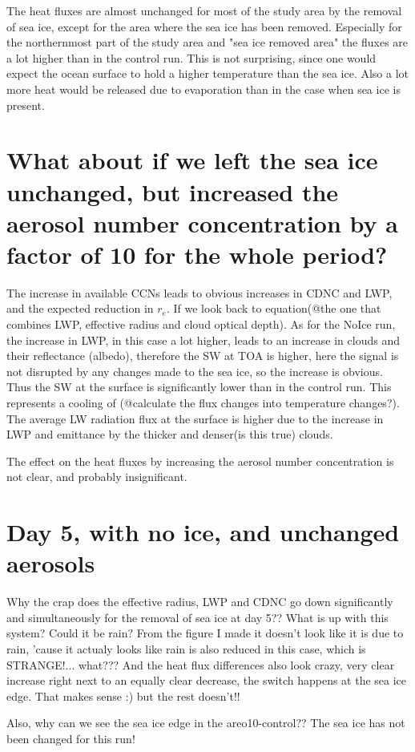 The heat fluxes are almost unchanged for most of the study area by the removal of sea ice, except for the area where the sea ice has been removed. Especially for the northernmost part of the study area and "sea ice removed area" the fluxes are a lot higher than in the control run. This is not surprising, since one would expect the ocean surface to hold a higher temperature than the sea ice. Also a lot more heat would be released due to evaporation than in the case when sea ice is present.

\section{What about if we left the sea ice unchanged, but increased the aerosol number concentration by a factor of 10 for the whole period?}
The increase in available CCNs leads to obvious increases in CDNC and LWP, and the expected reduction in $r_e$. If we look back to equation(@the one that combines LWP, effective radius and cloud optical depth). As for the NoIce run, the increase in LWP, in this case a lot higher, leads to an increase in clouds and their reflectance (albedo), therefore the SW at TOA is higher, here the signal is not disrupted by any changes made to the sea ice, so the increase is obvious. Thus the SW at the surface is significantly lower than in the control run. This represents a cooling of (@calculate the flux changes into temperature changes?). The average LW radiation flux at the surface is higher due to the increase in LWP and emittance by the thicker and denser(is this true) clouds.

The effect on the heat fluxes by increasing the aerosol number concentration is not clear, and probably insignificant.

\section{Day 5, with no ice, and unchanged aerosols}
Why the crap does the effective radius, LWP and CDNC go down significantly and simultaneously for the removal of sea ice at day 5?? What is up with this system? Could it be rain? From the figure I made it doesn't look like it is due to rain, 'cause it actualy looks like rain is also reduced in this case, which is STRANGE!... what??? And the heat flux differences also look crazy, very clear increase right next to an equally clear decrease, the switch happens at the sea ice edge. That makes sense :) but the rest doesn't!!

Also, why can we see the sea ice edge in the areo10-control?? The sea ice has not been changed for this run!

